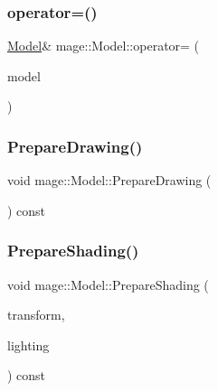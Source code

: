 \hypertarget{classmage_1_1_model_a084e30d15822bfefa79128f30a57cc02}{}\label{classmage_1_1_model_a084e30d15822bfefa79128f30a57cc02} 
\subsubsection{\texorpdfstring{operator=()}{operator=()}\hspace{0.1cm}{\footnotesize\ttfamily [2/2]}}
{\footnotesize\ttfamily \hyperlink{classmage_1_1_model}{Model}\& mage\+::\+Model\+::operator= (\begin{DoxyParamCaption}\item[{\hyperlink{classmage_1_1_model}{Model} \&\&}]{model }\end{DoxyParamCaption})\hspace{0.3cm}{\ttfamily [delete]}}

\hypertarget{classmage_1_1_model_a0083c64e8199db23b78a9281be84685f}{}\label{classmage_1_1_model_a0083c64e8199db23b78a9281be84685f} 
\subsubsection{\texorpdfstring{Prepare\+Drawing()}{PrepareDrawing()}}
{\footnotesize\ttfamily void mage\+::\+Model\+::\+Prepare\+Drawing (\begin{DoxyParamCaption}{ }\end{DoxyParamCaption}) const}

\hypertarget{classmage_1_1_model_a14cc836651dc3eeb378d749b24c149d9}{}\label{classmage_1_1_model_a14cc836651dc3eeb378d749b24c149d9} 
\subsubsection{\texorpdfstring{Prepare\+Shading()}{PrepareShading()}}
{\footnotesize\ttfamily void mage\+::\+Model\+::\+Prepare\+Shading (\begin{DoxyParamCaption}\item[{I\+D3\+D11\+Buffer $\ast$}]{transform,  }\item[{const \hyperlink{structmage_1_1_lighting}{Lighting} \&}]{lighting }\end{DoxyParamCaption}) const}



